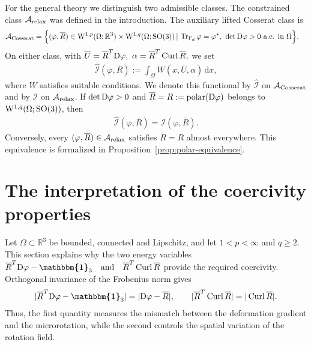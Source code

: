 \documentclass[11pt]{article}
\newcommand{\id}{{\boldsymbol{\mathbbm{1}}}}
\begin{document}
For the general theory we distinguish two admissible classes. The constrained class $\mathcal A_{\rm relax}$ was defined in the introduction. The auxiliary lifted Cosserat class is
\begin{align}
\mathcal A_{\rm Cosserat}
=
\Bigl\{
(\varphi, \overline R )&\in
{\rm W}^{1,p}(\Omega;\mathbb R^3)
\times  {\rm W}^{1,q}(\Omega;{\rm SO}(3)) \,|\,
\operatorname{Tr}_{\Gamma_d}\varphi=\varphi^*,
\ \det{\rm D}\varphi>0\ \text{a.e. in }\Omega
\Bigr\}.
\end{align}
On either class, with
$
 \overline U = \overline R ^T{\rm D}\varphi,
\ 
\alpha= \overline R ^T\operatorname{Curl} \overline R ,
$
we set
\begin{align}
\widehat{\mathcal I}(\varphi, \overline R )
:=
\int_\Omega W(x, \overline U ,\alpha)\,\mathrm dx,
\end{align}
where $W$ satisfies suitable conditions. We denote this functional by $\widehat{\mathcal I}$ on
$\mathcal A_{\rm Cosserat}$ and by $\mathcal I$ on
$\mathcal A_{\rm relax}$. 
If $\det{\rm D}\varphi>0$ and $\overline R=R:=\operatorname{polar}({\rm D}\varphi)$ belongs to $ {\rm W}^{1,q}(\Omega;{\rm SO}(3))$, then
\begin{align}
\widehat{\mathcal I}(\varphi,\overline R)
=
\mathcal I(\varphi, \overline R).
\end{align}
Conversely, every $(\varphi, \overline R )\in\mathcal A_{\rm relax}$ satisfies $ \overline R =R$ almost everywhere. This equivalence is formalized in Proposition~\ref{prop:polar-equivalence}.


\section{The interpretation of the coercivity properties}
\label{s2}\setcounter{equation}{0}


Let $\Omega\subset\mathbb R^3$ be bounded, connected and Lipschitz, and let $1<p<\infty$ and $q\geq 2$. This section explains why the two energy variables
$
\overline R^T{\rm D}\varphi-\id_3
\quad\text{and}\quad
\overline R^T\operatorname{Curl}\overline R
$
provide the required coercivity. Orthogonal invariance of the Frobenius norm gives
\begin{align}
|\overline R^T{\rm D}\varphi-\id_3|
=|{\rm D}\varphi-\overline  R|,
\qquad
|\overline R^T\operatorname{Curl}\overline R|
=|\operatorname{Curl}\overline R|.
\end{align}
Thus, the first quantity measures the mismatch between the deformation gradient and the microrotation, while the second controls the spatial variation of the rotation field.
\end{document}
